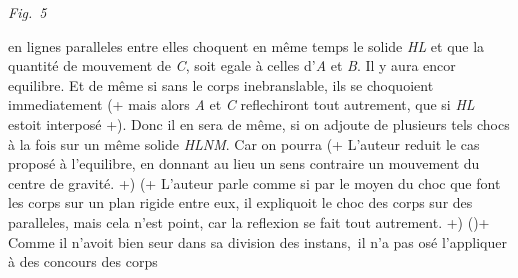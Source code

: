 \centerline{\lbrack\textit{Fig.~5}\rbrack}
\vspace{1.0em}
%
\pstart
%
%
%
%
en lignes paralleles entre \mbox{elles} choquent en même temps le solide
%
%
\textit{HL} et que la quantité de mouvement de \textit{C}, soit egale à celles d'\textit{A} et \textit{B}. 
%
Il y aura encor equilibre. 
%
Et de même si sans le corps inebranslable, ils se choquoient immediatement 
%
(+ mais alors \textit{A} et \textit{C} reflechiront tout autrement, que si \textit{HL} estoit interposé +). 
%
Donc il en sera de même, si on adjoute de 
\pend
\newpage
\pstart
\noindent plusieurs tels chocs à la fois sur un même solide \textit{HLNM}. 
%
Car on pourra 
%
%
%
(+ L'auteur reduit le cas proposé à l'equilibre, en donnant au lieu un sens contraire un mouvement du centre de gravité. +) 
%
(+ L'auteur parle comme si par le moyen du choc que font les corps sur un plan rigide entre eux, il expliquoit le choc des corps sur des paralleles, mais cela n'est point, car la reflexion se fait tout autrement. +) 
%
(\protect\vphantom)+ Comme il n'avoit
%
%
bien seur dans sa division des instans\lbrack,\rbrack\ il n'a pas osé l'appliquer à des concours des corps 
